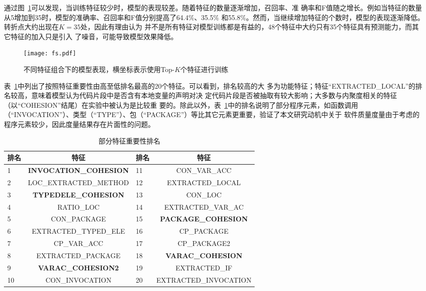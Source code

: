 通过图~\ref{features}可以发现，当训练特征较少时，模型的表现较差。随着特征的数量逐渐增加，召回率、准
确率和F值随之增长。例如当特征的数量从5增加到35时，模型的准确率、召回率和F值分别提高了64.4\%、35.5\%
和55.8\%。然而，当继续增加特征的个数时，模型的表现逐渐降低。转折点大约出现在$K=35$处，因此有理由认为
并不是所有特征对模型训练都是有益的，48个特征中大约只有35个特征具有预测能力，而其它特征的加入只是引入
了噪音，可能导致模型效果降低。

  \begin{figure}
  \centering
  \texttt{[image: fs.pdf]}
    \caption{不同特征组合下的模型表现，横坐标表示使用Top-$K$个特征进行训练}
    \label{features}
  \end{figure}

表~\ref{important_features}中列出了按照特征重要性由高至低排名最高的20个特征。可以看到，排名较高的大
多为功能特征；特征``EXTRACTED\_LOCAL''的排名较高，意味着模型认为代码片段中是否含有本地变量的声明对决
定代码片段是否被抽取有较大影响；大多数与内聚度相关的特征（以``COHESION''结尾）在实验中被认为是比较重
要的。除此以外，表~\ref{important_features}中的排名说明了部分程序元素，如函数调用
（``INVOCATION''）、类型（``TYPE''）、包（``PACKAGE''）等比其它元素更重要，验证了本文研究动机中关于
软件质量度量由于考虑的程序元素较少，因此度量结果存在片面性的问题。

\begin{table}[!t]
\zihaowu
  \renewcommand{\arraystretch}{1.3}
  \caption{部分特征重要性排名}
  \label{important_features}
  \centering
  \begin{tabular}{p{1cm}c|p{1cm}c}
  \toprule 排名 &特征 &排名 &特征 \\ \midrule
  1& \textbf{INVOCATION\_COHESION}& 11& CON\_VAR\_ACC\\
  2& LOC\_EXTRACTED\_METHOD& 12& EXTRACTED\_LOCAL\\
  3& \textbf{TYPEDELE\_COHESION}& 13& CON\_LOC\\
  4& RATIO\_LOC& 14& EXTRACTED\_VAR\_AC\\
  5& CON\_PACKAGE& 15& \textbf{PACKAGE\_COHESION}\\
  6& EXTRACTED\_TYPED\_ELE& 16& CP\_PACKAGE\\
  7& CP\_VAR\_ACC& 17& CP\_PACKAGE2\\
  8& EXTRACTED\_PACKAGE& 18& \textbf{VARAC\_COHESION}\\
  9& \textbf{VARAC\_COHESION2}& 19& EXTRACTED\_IF\\
  10& CON\_INVOCATION& 20& EXTRACTED\_INVOCATION\\
  \bottomrule 
  \end{tabular}
  \end{table}
  
